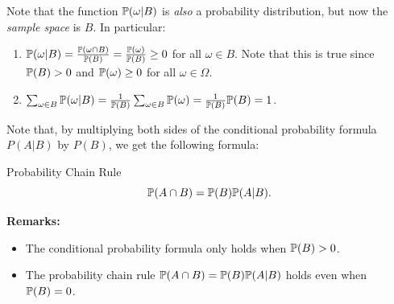 \documentclass[letterpaper]{article}
\begin{document}
Note that the function $\mathbb{P}(\omega | B)$ is \emph{also} a probability distribution, but now the \emph{sample space} is $B$. In particular:
\begin{enumerate}
    \item $\mathbb{P}(\omega | B) = \frac{\mathbb{P}(\omega \cap B)}{\mathbb{P}(B)} = \frac{\mathbb{P}(\omega)}{\mathbb{P}(B)} \geq 0$ for all $\omega \in B$. Note that this is true since $\mathbb{P}(B) > 0$ and $\mathbb{P}(\omega) \geq 0$ for all $\omega \in \Omega$. 
    \item $\sum_{\omega \in B} \mathbb{P}(\omega | B) = \frac{1}{\mathbb{P}(B)} \sum_{\omega \in B} \mathbb{P}(\omega) = \frac{1}{\mathbb{P}(B)} \mathbb{P}(B) = 1$. 
\end{enumerate}
Note that, by multiplying both sides of the conditional probability formula $P(A | B)$ by $P(B)$, we get the following formula:
\begin{theorem}{Probability Chain Rule}{}
    \[\mathbb{P}(A \cap B) = \mathbb{P}(B) \mathbb{P}(A | B).\]
\end{theorem}
\textbf{Remarks:}
\begin{itemize}
    \item The conditional probability formula only holds when $\mathbb{P}(B) > 0$. 
    \item The probability chain rule $\mathbb{P}(A \cap B) = \mathbb{P}(B) \mathbb{P}(A | B)$ holds even when $\mathbb{P}(B) = 0$. 
\end{itemize}
\end{document}
